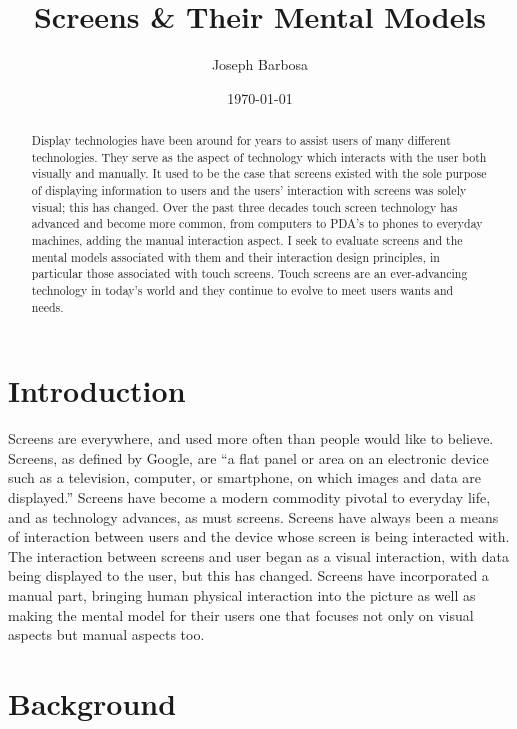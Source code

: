\documentclass[12pt]{article}
\title{Screens \& Their Mental Models}
\author{Joseph Barbosa}
\date{\today}
\begin{document}
\maketitle

\begin{abstract}

     Display technologies have been around for years to assist users of many different technologies. They serve as the aspect of technology which interacts with the user both visually and manually. It used to be the case that screens existed with the sole purpose of displaying information to users and the users' interaction with screens was solely visual; this has changed. Over the past three decades touch screen technology has advanced and become more common, from computers to PDA's to phones to everyday machines, adding the manual interaction aspect. I seek to evaluate screens and the mental models associated with them and their interaction design principles, in particular those associated with touch screens. Touch screens are an ever-advancing technology in today's world and they continue to evolve to meet users wants and needs.

\end{abstract}

\section{Introduction}

     Screens are everywhere, and used more often than people would like to believe. Screens, as defined by Google, are ``a flat panel or area on an electronic device such as a television, computer, or smartphone, on which images and data are displayed.'' Screens have become a modern commodity pivotal to everyday life, and as technology advances, as must screens. Screens have always been a means of interaction between users and the device whose screen is being interacted with. The interaction between screens and user began as a visual interaction, with data being displayed to the user, but this has changed. Screens have incorporated a manual part, bringing human physical interaction into the picture as well as making the mental model for their users one that focuses not only on visual aspects but manual aspects too. 

\section{Background}
\end{document}
